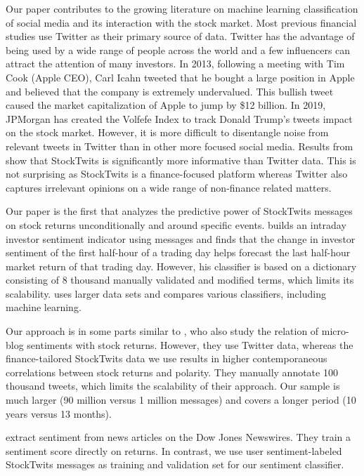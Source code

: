 Our paper contributes to the growing literature on machine learning classification of social media and its interaction with the stock market. Most previous financial studies use Twitter as their primary source of data. Twitter has the advantage of being used by a wide range of people across the world and a few influencers can attract the attention of many investors. In 2013, following a meeting with Tim Cook (Apple CEO), Carl Icahn tweeted that he bought a large position in Apple and believed that the company is extremely undervalued. This bullish tweet caused the market capitalization of Apple to jump by \$12 billion. In 2019, JPMorgan has created the Volfefe Index to track Donald Trump's tweets impact on the stock market. However, it is more difficult to disentangle noise from relevant tweets in Twitter than in other more focused social media. Results from \citet{Ghoshal} show that StockTwits is significantly more informative than Twitter data. This is not surprising as StockTwits is a finance-focused platform whereas Twitter also captures irrelevant opinions on a wide range of non-finance related matters. 

Our paper is the first that analyzes the predictive power of StockTwits messages on stock returns unconditionally and around specific events. \citet{renault2017intraday} builds an intraday investor sentiment indicator using messages and finds that the change in investor sentiment of the first half-hour of a trading day helps forecast the last half-hour market return of that trading day. However, his classifier is based on a dictionary consisting of 8 thousand manually validated and modified terms, which limits its scalability. \citet{renault2020sentiment} uses larger data sets and compares various classifiers, including machine learning. 

Our approach is in some parts similar to \citet{ranco2015effects}, who also study the relation of micro-blog sentiments with stock returns. However, they use Twitter data, whereas the finance-tailored StockTwits data we use results in higher contemporaneous correlations between stock returns and polarity. They manually annotate 100 thousand tweets, which limits the scalability of their approach. Our sample is much larger (90 million versus 1 million messages) and covers a longer period (10 years versus 13 months). 

\citet{ke_kel_xiu_20} extract sentiment from news articles on the Dow Jones Newswires. They train a  sentiment score directly on returns. In contrast, we use user sentiment-labeled StockTwits messages as training and validation set for our sentiment classifier.


